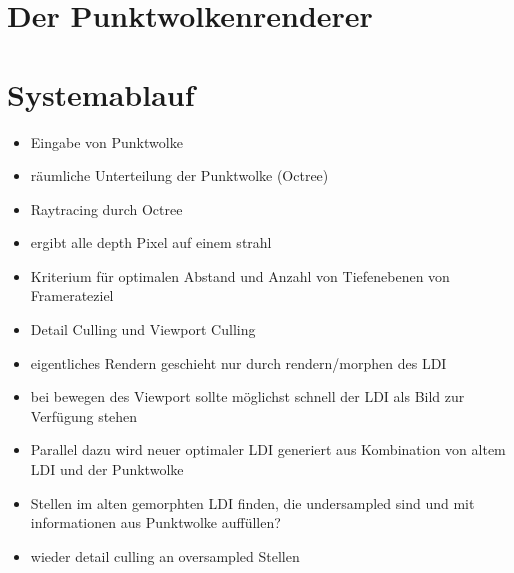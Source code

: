 \documentclass[hyperref, beleg, german]{cgvpub}
\begin{document}
\section{Der Punktwolkenrenderer}

\section{Systemablauf}

\begin{itemize}
\item Eingabe von Punktwolke
\item räumliche Unterteilung der Punktwolke (Octree)
\item Raytracing durch Octree
\item ergibt alle depth Pixel auf einem strahl
\item Kriterium für optimalen Abstand und Anzahl von Tiefenebenen von Framerateziel
\item Detail Culling und Viewport Culling
\item eigentliches Rendern geschieht nur durch rendern/morphen des LDI
\item bei bewegen des Viewport sollte möglichst schnell der LDI als Bild zur Verfügung stehen
\item Parallel dazu wird neuer optimaler LDI generiert aus Kombination von altem LDI und der Punktwolke
\item Stellen im alten gemorphten LDI finden, die undersampled sind und mit informationen aus Punktwolke auffüllen?
\item wieder detail culling an oversampled Stellen
\end{itemize}
\end{document}
